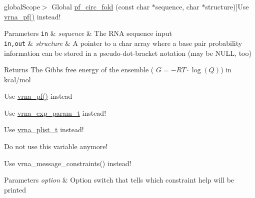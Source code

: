 \begin{DoxyRefList}
global\+Scope$>$ Global \hyperlink{group__pf__fold_ga819ce5fca8984004ac81c4a3b04cb735}{pf\+\_\+circ\+\_\+fold} (const char $\ast$sequence, char $\ast$structure)]Use \hyperlink{group__pf__fold_ga29e256d688ad221b78d37f427e0e99bc}{vrna\+\_\+pf()} instead! 
\begin{DoxyParams}[1]{Parameters}
\mbox{\tt in}  & {\em sequence} & The R\+N\+A sequence input \\
\hline
\mbox{\tt in,out}  & {\em structure} & A pointer to a char array where a base pair probability information can be stored in a pseudo-\/dot-\/bracket notation (may be N\+U\+L\+L, too) \\
\hline
\end{DoxyParams}
\begin{DoxyReturn}{Returns}
The Gibbs free energy of the ensemble ( $G = -RT \cdot \log(Q) $) in kcal/mol  
\end{DoxyReturn}

\item[\label{deprecated__deprecated000094}%
\hypertarget{deprecated__deprecated000094}{}%
global\+Scope$>$ Global \hyperlink{group__pf__fold_gac4f95bee734b2563a3d6e9932117ebdf}{pf\+\_\+fold\+\_\+par} (const char $\ast$sequence, char $\ast$structure, vrna\+\_\+exp\+\_\+param\+\_\+t $\ast$parameters, int calculate\+\_\+bppm, int is\+\_\+constrained, int is\+\_\+circular)]Use \hyperlink{group__pf__fold_ga29e256d688ad221b78d37f427e0e99bc}{vrna\+\_\+pf()} instead 
\item[\label{deprecated__deprecated000084}%
\hypertarget{deprecated__deprecated000084}{}%
global\+Scope$>$ Global \hyperlink{group__energy__parameters_ga8bffe1828e2cbec101769f5cc0b1535b}{pf\+\_\+param\+T} ]Use \hyperlink{group__energy__parameters_ga01d8b92fe734df8d79a6169482c7d8d8}{vrna\+\_\+exp\+\_\+param\+\_\+t} instead!  
\item[\label{deprecated__deprecated000043}%
\hypertarget{deprecated__deprecated000043}{}%
global\+Scope$>$ Global \hyperlink{group__data__structures_gab1d8894b43aa84cbc50b862a73785fbc}{plist} ]Use \hyperlink{group__data__structures_ga8e4eb5e1bfc95776559575beb359af87}{vrna\+\_\+plist\+\_\+t} instead!  
\item[\label{deprecated__deprecated000077}%
\hypertarget{deprecated__deprecated000077}{}%
global\+Scope$>$ Global \hyperlink{fold__vars_8h_ac98ec419070aee6831b44e5c700f090f}{pr} ]Do not use this variable anymore!  
\item[\label{deprecated__deprecated000039}%
\hypertarget{deprecated__deprecated000039}{}%
global\+Scope$>$ Global \hyperlink{constraints_8h_a4d167deb70bb51723e44374dc981deb2}{print\+\_\+tty\+\_\+constraint} (unsigned int option)]Use vrna\+\_\+message\+\_\+constraints() instead! 
\begin{DoxyParams}{Parameters}
{\em option} & Option switch that tells which constraint help will be printed  \\
\hline
\end{DoxyParams}


\end{DoxyRefList}
